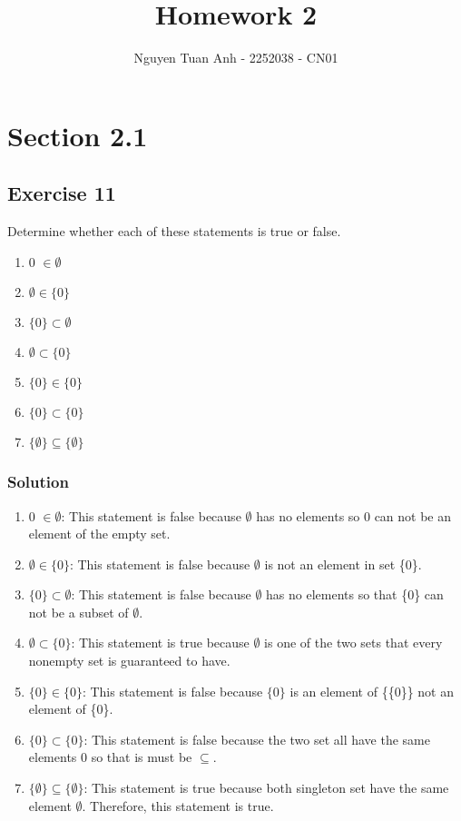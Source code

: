 \documentclass{article}
\title{Homework 2}
\author{Nguyen Tuan Anh - 2252038 - CN01}
\theoremstyle{mytheoremstyle}
\theoremstyle{mytheoremstyle}
\theoremstyle{myproblemstyle}
\begin{document}
    \maketitle
    \section*{Section 2.1}
    \subsection*{Exercise 11}
        Determine whether each of these statements is true or false.
        \begin{enumerate} [label = (\alph*)]
            \item 0 $ \in \emptyset$
            \item $ \emptyset \in \{0\}$
            \item $ \{0\} \subset \emptyset $
            \item $ \emptyset \subset \{0\} $
            \item $ \{0\} \in \{0\} $
            \item $ \{0\} \subset \{0\} $
            \item $ \{\emptyset\} \subseteq \{\emptyset\}$
        \end{enumerate}
    \subsubsection*{Solution}
        \begin{enumerate} [label = (\alph*)]
            \item 0 $ \in \emptyset$: This statement is false because $\emptyset$
            has no elements so 0 can not be an element of the empty set.
            \item $ \emptyset \in \{0\}$: This statement is false because
            $ \emptyset $ is not an element in set \{0\}.
            \item $ \{0\} \subset \emptyset $: This statement is false because
            $ \emptyset $ has no elements so that \{0\} can not be a subset
            of $ \emptyset $.
            \item $ \emptyset \subset \{0\} $: This statement is true because
            $ \emptyset $ is one of the two sets that every nonempty set is
            guaranteed to have.
            \item $ \{0\} \in \{0\} $: This statement is false because 
            $ \{0\} $ is an element of \{\{0\}\} not an element of \{0\}.
            \item $ \{0\} \subset \{0\} $: This statement is false because the
            two set all have the same elements 0 so that is must be $ \subseteq $.
            \item $ \{\emptyset\} \subseteq \{\emptyset\}$: This statement is true
            because both singleton set have the same element $ \emptyset $. Therefore, this
            statement is true.
        \end{enumerate}
\end{document}
